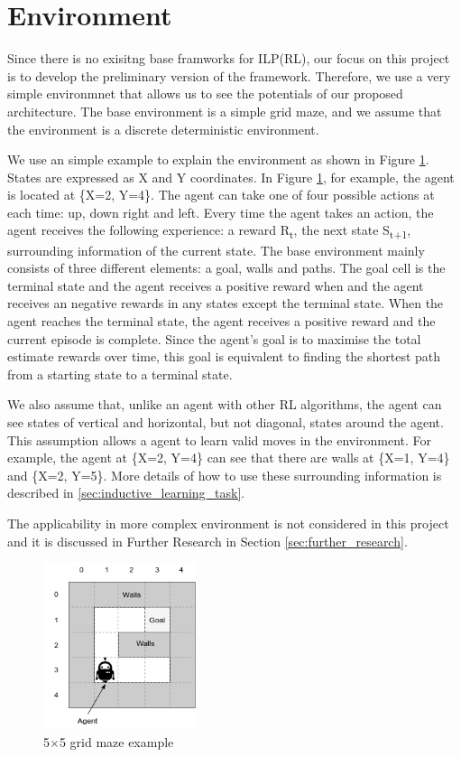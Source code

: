 \section{Environment}
\label{sec:environment}
Since there is no exisitng base framworks for ILP(RL), our focus on this project is to develop the preliminary version of the framework. 
Therefore, we use a very simple environmnet that allows us to see the potentials of our proposed architecture.
The base environment is a simple grid maze, and we assume that the environment is a discrete deterministic environment. 

We use an simple example to explain the environment as shown in Figure \ref{environment_example}.
States are expressed as X and Y coordinates. In Figure \ref{environment_example}, for example, the agent is located at \{X=2, Y=4\}.
The agent can take one of four possible actions at each time: up, down right and left.
Every time the agent takes an action, the agent receives the following experience: a reward R\textsubscript{t}, the next state S\textsubscript{t+1}, surrounding information of the current state.
The base environment mainly consists of three different elements: a goal, walls and paths.
The goal cell is the terminal state and the agent receives a positive reward when and the agent receives an negative rewards in any states except the terminal state.
When the agent reaches the terminal state, the agent receives a positive reward and the current episode is complete. 
Since the agent's goal is to maximise the total estimate rewards over time, this goal is equivalent to finding the shortest path from a starting state to a terminal state.

We also assume that, unlike an agent with other RL algorithms, the agent can see states of vertical and horizontal, but not diagonal, states around the agent. 
This assumption allows a agent to learn valid moves in the environment. For example, the agent at \{X=2, Y=4\} can see that there are walls at \{X=1, Y=4\} and \{X=2, Y=5\}.
More details of how to use these surrounding information is described in \ref{sec:inductive_learning_task}.

The applicability in more complex environment is not considered in this project and it is discussed in Further Research in Section \ref{sec:further_research}.

\begin{figure}[!htb]
\centering
\includegraphics[width=0.4\textwidth]{./figures/environment_example}
\caption{5$\times$5 grid maze example}
\label{environment_example}
\end{figure}

